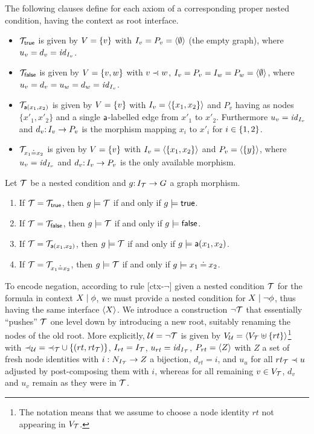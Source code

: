 \begin{definition}
\label{def:atomic formulas}
The following clauses define for each axiom of  a corresponding proper nested condition, having the context as root interface. 
\begin{itemize}
\item ${\mathcal{T}}_{\mathsf{true}}$ is given by $V=\{{v}\}$ with $I_v=P_v=\langle \emptyset\rangle$ (the empty graph), where $u_v=d_v={\mathit{id}}_{I_v}$.
\item ${\mathcal{T}}_{\mathsf{false}}$ is given by $V=\{{v,w}\}$ with $v\parentof w$, $I_v=P_v=I_w=P_w=\langle \emptyset\rangle$, where $u_v=d_v=u_w=d_w={\mathit{id}}_{I_v}$.
\item ${\mathcal{T}}_{\mathsf{a}(x_1,x_2)}$ is given by $V=\{{v}\}$ with $I_v=\langle \{{x_1,x_2}\}\rangle$ and $P_v$ having as nodes $\{x'_1, x'_2\}$ and a single $\mathsf{a}$-labelled edge from $x'_1$ to $x'_2$. Furthermore $u_v={\mathit{id}}_{I_v}$ and $d_v{:}\, I_v\rightarrow P_v$ is the morphism mapping $x_i$ to $x'_i$ for $i \in \{{1,2}\}$. 
\item ${\mathcal{T}}_{x_1\mathbin{\doteq} x_2}$ is given by $V=\{{v}\}$ with $I_v=\langle \{{x_1,x_2}\}\rangle$ and $P_v=\langle \{{y}\}\rangle$, where $u_v={\mathit{id}}_{I_v}$ and $d_v{:}\, I_v\rightarrow P_v$ is the only available morphism.
\end{itemize}
\end{definition}

\begin{proposition}
	\label{pr:atomic satisfaction}
Let ${\mathcal{T}}$ be a {\proper} nested condition and $g{:}\, I_{\mathcal{T}}\rightarrow G$ a graph morphism.
\begin{enumerate}
\item If ${\mathcal{T}}={\mathcal{T}}_{\mathsf{true}}$, then $g\models {\mathcal{T}}$ if and only if $g\models\mathsf{true}$.
\item If ${\mathcal{T}}={\mathcal{T}}_{\mathsf{false}}$, then $g\models {\mathcal{T}}$ if and only if $g\models\mathsf{false}$.
\item If ${\mathcal{T}}={\mathcal{T}}_{\mathsf{a}(x_1,x_2)}$, then $g\models {\mathcal{T}}$ if and only if $g\models\mathsf{a}(x_1,x_2)$.
\item If ${\mathcal{T}}={\mathcal{T}}_{x_1\mathbin{\doteq} x_2}$, then $g\models {\mathcal{T}}$ if and only if $g\models x_1\mathbin{\doteq} x_2$.
\end{enumerate}
\end{proposition}

To encode negation, according to rule [ctx-$\neg$] given a {\proper} nested condition ${\mathcal{T}}$ for the formula in context ${X} \mid {\phi}$, we must provide a {\proper} nested condition for ${X} \mid {\neg \phi}$, thus having the same interface $\langle X\rangle$. We introduce a construction $\neg{\mathcal{T}}$ that essentially ``pushes'' ${\mathcal{T}}$ one level down by introducing a new root, suitably renaming the nodes of the old root.
More explicitly, ${\mathcal{U}}=\neg{\mathcal{T}}$ is given by $V_{\mathcal{U}}=\langle V_{\mathcal{T}}\uplus\{{rt}\}\rangle$\footnote{The notation means that we assume to choose a node identity $rt$ not appearing in $V_{\mathcal{T}}$.} with ${\parentof[\cU]}= {\parentof[\cT]}\cup \setof{(rt,\rtof\cT)}$, $I_{rt} = I_{\mathcal{T}}$, $u_{rt}={\mathit{id}}_{I_{\mathcal{T}}}$, $P_{rt} = \langle Z\rangle$ with $Z$ a set of fresh node identities with $i: N_{I_{\mathcal{T}}} \rightarrow Z$ a bijection, $d_{rt} = i$,  and $u_u$ for all $rt_\cT \parentof u$ adjusted by post-composing them with $i$, whereas for all remaining $v\in V_{\mathcal{T}}$, $d_v$ and $u_v$ remain as they were in ${\mathcal{T}}$.

